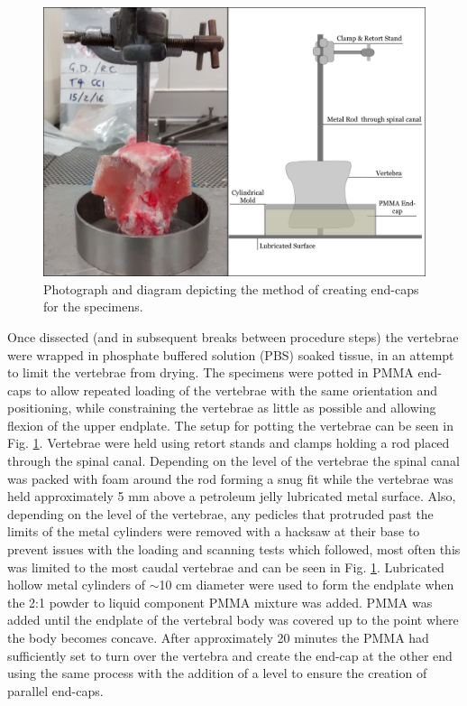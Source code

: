 \begin{figure}[ht!]
\centering
\includegraphics[width=5in]{images/potting_vertebra.png}
\caption{Photograph and diagram depicting the method of creating end-caps for the specimens.}
\label{fig:potting_vertebra}
\end{figure}



Once dissected (and in subsequent breaks between procedure steps) the
vertebrae were wrapped in phosphate buffered solution (PBS) soaked
tissue, in an attempt to limit the vertebrae from drying.
The specimens were potted in PMMA end-caps to allow repeated loading of the vertebrae with
the same orientation and positioning, while constraining the vertebrae
as little as possible and allowing flexion of the upper endplate. The setup for potting the vertebrae can be seen in Fig. \ref{fig:potting_vertebra}.
Vertebrae were held using retort stands and clamps holding a rod placed
through the spinal canal. Depending on the level of the vertebrae the
spinal canal was packed with foam around the rod forming a snug fit
while the vertebrae was held approximately 5 mm above a petroleum jelly
lubricated metal surface. Also, depending on the level of the vertebrae,
any pedicles that protruded past the limits of the metal cylinders were
removed with a hacksaw at their base to prevent issues with the loading
and scanning tests which followed, most often this was limited to the
most caudal vertebrae and can be seen in Fig. \ref{fig:potting_vertebra}. Lubricated hollow metal cylinders of \(\sim\)10
cm diameter were used to form the endplate when the 2:1 powder to liquid
component PMMA mixture was added. PMMA was added until the endplate of
the vertebral body was covered up to the point where the body becomes
concave. After approximately 20 minutes the PMMA had sufficiently set to turn over
the vertebra and create the end-cap at the other end using the same
process with the addition of a level to ensure the creation of parallel
end-caps.

